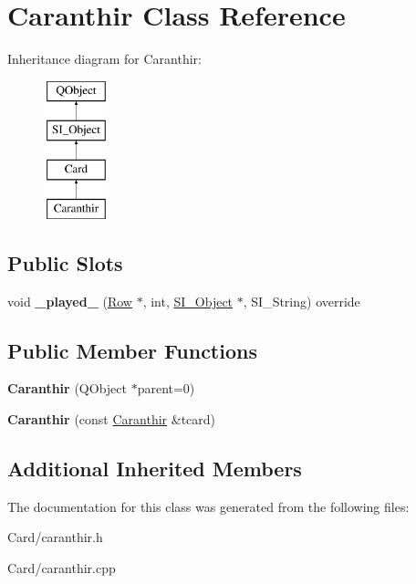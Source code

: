 \hypertarget{class_caranthir}{}\section{Caranthir Class Reference}
\label{class_caranthir}
Inheritance diagram for Caranthir\+:\begin{figure}[H]
\begin{center}
\leavevmode
\includegraphics[height=4.000000cm]{class_caranthir}
\end{center}
\end{figure}
\subsection*{Public Slots}
\begin{DoxyCompactItemize}
\item 
\mbox{\label{class_caranthir_a78d4f76fcc542e101e00be70afcf8d8f}} 
void {\bfseries \+\_\+played\+\_\+} (\hyperlink{class_card_set}{Row} $\ast$, int, \hyperlink{class_s_i___object}{S\+I\+\_\+\+Object} $\ast$, S\+I\+\_\+\+String) override
\end{DoxyCompactItemize}
\subsection*{Public Member Functions}
\begin{DoxyCompactItemize}
\item 
\mbox{\label{class_caranthir_ade6da7b42ee423be9f6e1f9b80e4b044}} 
{\bfseries Caranthir} (Q\+Object $\ast$parent=0)
\item 
\mbox{\label{class_caranthir_ac5c6b7e8c2f2505b9270c7f5b131aa50}} 
{\bfseries Caranthir} (const \hyperlink{class_caranthir}{Caranthir} \&tcard)
\end{DoxyCompactItemize}
\subsection*{Additional Inherited Members}


The documentation for this class was generated from the following files\+:\begin{DoxyCompactItemize}
\item 
Card/caranthir.\+h\item 
Card/caranthir.\+cpp\end{DoxyCompactItemize}
